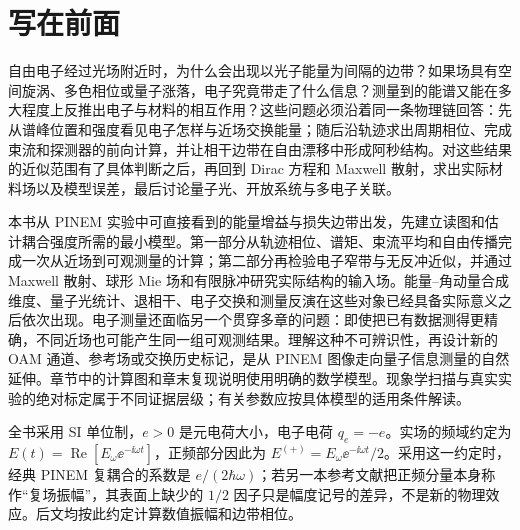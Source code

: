 \chapter*{写在前面}

自由电子经过光场附近时，为什么会出现以光子能量为间隔的边带？如果场具有空间旋涡、多色相位或量子涨落，电子究竟带走了什么信息？测量到的能谱又能在多大程度上反推出电子与材料的相互作用？这些问题必须沿着同一条物理链回答：先从谱峰位置和强度看见电子怎样与近场交换能量；随后沿轨迹求出周期相位、完成束流和探测器的前向计算，并让相干边带在自由漂移中形成阿秒结构。对这些结果的近似范围有了具体判断之后，再回到 Dirac 方程和 Maxwell 散射，求出实际材料场以及模型误差，最后讨论量子光、开放系统与多电子关联。

本书从 PINEM 实验中可直接看到的能量增益与损失边带出发，先建立读图和估计耦合强度所需的最小模型。第一部分从轨迹相位、谱矩、束流平均和自由传播完成一次从近场到可观测量的计算；第二部分再检验电子窄带与无反冲近似，并通过 Maxwell 散射、球形 Mie 场和有限脉冲研究实际结构的输入场。能量--角动量合成维度、量子光统计、退相干、电子交换和测量反演在这些对象已经具备实际意义之后依次出现。电子测量还面临另一个贯穿多章的问题：即使把已有数据测得更精确，不同近场也可能产生同一组可观测结果。理解这种不可辨识性，再设计新的 OAM 通道、参考场或交换历史标记，是从 PINEM 图像走向量子信息测量的自然延伸。章节中的计算图和章末复现说明使用明确的数学模型。现象学扫描与真实实验的绝对标定属于不同证据层级；有关参数应按具体模型的适用条件解读。

全书采用 SI 单位制，$e>0$ 是元电荷大小，电子电荷 $q_e=-e$。实场的频域约定为 $E(t)=\operatorname{Re}[E_\omega\ee^{-\ii\omega t}]$，正频部分因此为 $E^{(+)}=E_\omega\ee^{-\ii\omega t}/2$。采用这一约定时，经典 PINEM 复耦合的系数是 $e/(2\hbar\omega)$；若另一本参考文献把正频分量本身称作“复场振幅”，其表面上缺少的 $1/2$ 因子只是幅度记号的差异，不是新的物理效应。后文均按此约定计算数值振幅和边带相位。
